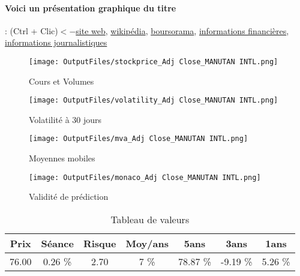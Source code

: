 \documentclass[11pt,a4paper]{report}%
\begin{document}
\paragraph{Voici un présentation graphique du titre} : (Ctrl + Clic)$<-$\href{https://www.manutan.fr/fr/maf}{site web}, \href{https://fr.wikipedia.org/wiki/Manutan_International}{wikipédia}, \href{https://www.boursorama.com/cours/1rPMAN}{boursorama}, \href{https://www.qwant.com/?q=site:https:%2f%2fwww.easybourse.com%2faction-societe%2fMANUTAN-INTL&t=web&client=ext-firefox-hp}{informations financières}, \href{https://bourse.lerevenu.com/cours-de-bourse/fiche-valeur-synthese/MANUTAN-INTL/MAN-FR}{informations journalistiques}
\begin{figure}[!htb]
   \begin{minipage}{0.5\textwidth}
     \centering
     \texttt{[image: OutputFiles/stockprice\_Adj Close\_MANUTAN INTL.png]}
     \caption{Cours et Volumes}\label{Fig:price_MANUTAN INTL}
   \end{minipage}\hfill
   \begin{minipage}{0.5\textwidth}
     \centering
     \texttt{[image: OutputFiles/volatility\_Adj Close\_MANUTAN INTL.png]}
     \caption{Volatilité à 30 jours}\label{Fig:volat_MANUTAN INTL}
   \end{minipage}
\end{figure}
\begin{figure}[!htb]
   \begin{minipage}{0.5\textwidth}
     \centering
     \texttt{[image: OutputFiles/mva\_Adj Close\_MANUTAN INTL.png]}
     \caption{Moyennes mobiles}\label{Fig:mva_MANUTAN INTL}
   \end{minipage}\hfill
   \begin{minipage}{0.5\textwidth}
     \centering
     \texttt{[image: OutputFiles/monaco\_Adj Close\_MANUTAN INTL.png]}
     \caption{Validité de prédiction}\label{Fig:prediction_MANUTAN INTL}
   \end{minipage}
\end{figure}

\begin{table}[H]
  \centering
    \begin{tabular}{|c|c|c|c|c|c|c|}
    \hline
    Prix & Séance & Risque  & Moy/ans & 5ans & 3ans & 1ans \\
    \hline
    76.00 &    0.26 \%    & 2.70 & 7 \% & 78.87 \% & -9.19 \% & 5.26 \% \\
    \hline
    \end{tabular}%
        \label{tab:table_MANUTAN INTL}%
      \caption{Tableau de valeurs}
\end{table}%
\end{document}
